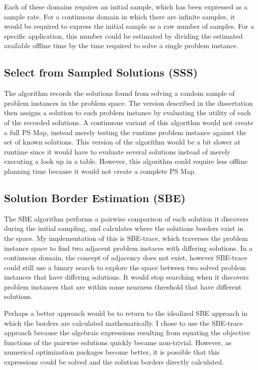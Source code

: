 Each of these domains requires an initial sample, which has been expressed as a sample rate.  For a continuous domain in which there are infinite samples, it would be required to express the initial sample as a raw number of samples.  For a specific application, this number could be estimated by dividing the estimated available offline time by the time required to solve a single problem instance.

\subsection{Select from Sampled Solutions (SSS)}
The algorithm records the solutions found from solving a random sample of problem instances in the problem space.  The version described in the dissertation then assigns a solution to each problem instance by evaluating the utility of each of the recorded solutions.  A continuous variant of this algorithm would not create a full PS Map, instead merely testing the runtime problem instance against the set of known solutions.  This version of the algorithm would be a bit slower at runtime since it would have to evaluate several solutions instead of merely executing a look up in a table.  However, this algorithm could require less offline planning time because it would not create a complete PS Map.


\subsection{Solution Border Estimation (SBE)}
The SBE algorithm performs a pairwise comparison of each solution it discovers during the initial sampling, and calculates where the solutions borders exist in the space.  My implementation of this is SBE-trace, which traverses the problem instance space to find two adjacent problem instaces with differing solutions.  In a continuous domain, the concept of adjacency does not exist, however SBE-trace could still use a binary search to explore the space between two solved problem instances that have differing solutions.  It would stop searching when it discovers problem instances that are within some nearness threshold that have different solutions.

Perhaps a better approach would be to return to the idealized SBE approach in which the borders are calculated mathematically. I chose to use the SBE-trace approach because the algebraic expressions resulting from equating the objective functions of the pairwise solutions quickly became non-trivial. However, as numerical optimization packages become better, it is possible that this expressions could be solved and the solution borders directly calculated.


